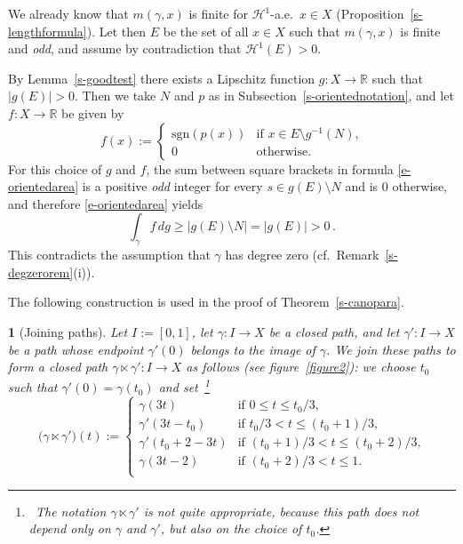 \documentclass[11pt,reqno,a4paper,final]{amsart}
\makeatletter
\numberwithin{equation}{section}
\theoremstyle{mytheorem}
\theoremstyle{myremark}
\theoremstyle{myparagraph}
\newtheorem{parag}[subsection]{}
\renewenvironment{proof}[1][\proofname]{\par 
  \pushQED{\qed}%
  \normalfont \topsep10\p@\@plus6\p@\relax 
  \trivlist 
  \item[\hskip\labelsep 
    \bfseries 
    #1\@addpunct{.}]\ignorespaces 
}{%
  \popQED\endtrivlist\@endpefalse 
}
\providecommand{\proofname}{Proof}
\newcommand{\footnoteb}[1]{\footnote{~#1}}
\newcommand{\R}{\mathbb{R}}
\newcommand{\Haus}{\mathscr{H}}
\newcommand{\sgn}{\mathrm{sgn}}
\makeatother
\begin{document}
\begin{proof}[Proof of Proposition~\ref{s-degzeroprop}(iii)]
We already know that $m(\gamma,x)$ is finite for $\Haus^1$-a.e.~$x\in X$
(Proposition~\ref{s-lengthformula}).
Let then $E$ be the set of all $x\in X$ such that $m(\gamma,x)$ 
is finite and \emph{odd}, and assume by contradiction that $\Haus^1(E)>0$.

By Lemma~\ref{s-goodtest} there exists a Lipschitz function 
$g:X\to\R$ such that $|g(E)|>0$.  
Then we take $N$ and $p$ as in Subsection~\ref{s-orientednotation}, 
and let $f:X\to\R$ be given by
\[
f(x):=
\begin{cases}
	 \sgn(p(x)) & \text{if $x\in E\setminus g^{-1}(N)$,} \\
	 0 & \text{otherwise.}
\end{cases}
\]
For this choice of $g$ and $f$, the sum between square brackets 
in formula \eqref{e-orientedarea} is a positive \emph{odd} integer 
for every $s\in g(E)\setminus N$ and is $0$ otherwise, 
and therefore \eqref{e-orientedarea} yields
\[
\int_\gamma f \, dg
\ge |g(E)\setminus N|
= |g(E)| 
>0
\, .
\]
This contradicts the assumption that $\gamma$ has degree zero 
(cf.~Remark~\ref{s-degzerorem}(i)).
\end{proof}

The following construction is used in the proof of 
Theorem~\ref{s-canopara}.

\begin{parag}[Joining paths]
\label{s-joinpath}
Let $I:=[0,1]$, let $\gamma:I\to X$ be a \emph{closed} path, 
and let $\gamma':I\to X$ be a path whose endpoint 
$\gamma'(0)$ belongs to the image of $\gamma$.
We join these paths to form a \emph{closed} path 
$\gamma\ltimes\gamma':I\to X$ as follows (see figure~\ref{figure2}): 
we choose $t_0$ such that $\gamma'(0)=\gamma(t_0)$ and set%
%
\,\footnoteb
{The notation $\gamma\ltimes\gamma'$ is not quite appropriate, 
because this path does not depend
only on $\gamma$ and $\gamma'$, but also on the choice of $t_0$.}
%
\[
\big( \gamma\ltimes\gamma'\big) (t):= 
  \begin{cases}
    \gamma(3t)        & \text{if $0\le t \le t_0/3$,} \\
    \gamma'(3t-t_0)   & \text{if $t_0/3 < t \le (t_0+1)/3$,} \\
    \gamma'(t_0+2-3t) & \text{if $(t_0+1)/3 < t \le (t_0+2)/3$,} \\
    \gamma(3t-2)      & \text{if $(t_0+2)/3 < t \le 1$.} \\
  \end{cases}
\]
\end{parag}
\end{document}
